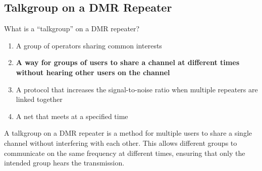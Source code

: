 \subsection{Talkgroup on a DMR Repeater}
\label{T8D02}

\begin{tcolorbox}[colback=gray!10!white,colframe=black!75!black,title=T8D02]
What is a “talkgroup” on a DMR repeater?
\begin{enumerate}[noitemsep]
    \item A group of operators sharing common interests
    \item \textbf{A way for groups of users to share a channel at different times without hearing other users on the channel}
    \item A protocol that increases the signal-to-noise ratio when multiple repeaters are linked together
    \item A net that meets at a specified time
\end{enumerate}
\end{tcolorbox}

A talkgroup on a DMR repeater is a method for multiple users to share a single channel without interfering with each other. This allows different groups to communicate on the same frequency at different times, ensuring that only the intended group hears the transmission.
